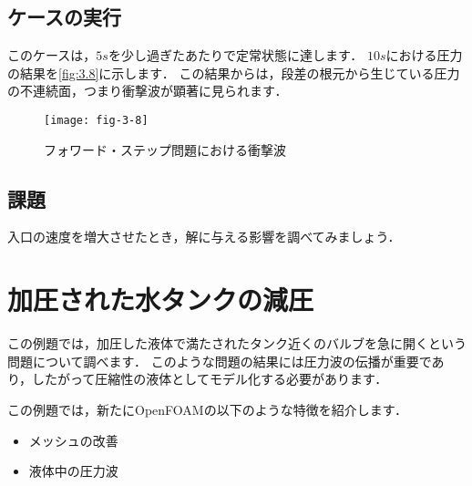 \subsection{ケースの実行}
\label{ssec:3.3.3}
このケースは，$5 \unit{s}$を少し過ぎたあたりで定常状態に達します．
$10 \unit{s}$における圧力の結果を\autoref{fig:3.8}に示します．
この結果からは，段差の根元から生じている圧力の不連続面，つまり衝撃波が顕著に見られます．


\begin{figure}[ht]
 \texttt{[image: fig-3-8]}
 \caption{フォワード・ステップ問題における衝撃波}
 \label{fig:3.8}
\end{figure}


\subsection{課題}
\label{ssec:3.3.4}
入口の速度を増大させたとき，解に与える影響を調べてみましょう．



\section{加圧された水タンクの減圧}
%
%
\label{sec:3.4}
この例題では，加圧した液体で満たされたタンク近くのバルブを急に開くという問題について調べます．
このような問題の結果には圧力波の伝播が重要であり，したがって圧縮性の液体としてモデル化する必要があります．

この例題では，新たにOpenFOAMの以下のような特徴を紹介します．
\begin{itemize}
 \item メッシュの改善
 \item 液体中の圧力波
\end{itemize}


